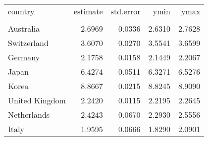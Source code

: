 \begin{tabular}{lrrrr}
   \toprule 
 
country & estimate & std.error & ymin & ymax \\ 

\cmidrule(lr){1-5} 
 
\\[-1.8ex]  
 
Australia & 2.6969 & 0.0336 & 2.6310 & 2.7628 \\ 
  Switzerland & 3.6070 & 0.0270 & 3.5541 & 3.6599 \\ 
  Germany & 2.1758 & 0.0158 & 2.1449 & 2.2067 \\ 
  Japan & 6.4274 & 0.0511 & 6.3271 & 6.5276 \\ 
  Korea & 8.8667 & 0.0215 & 8.8245 & 8.9090 \\ 
  United Kingdom & 2.2420 & 0.0115 & 2.2195 & 2.2645 \\ 
  Netherlands & 2.4243 & 0.0670 & 2.2930 & 2.5556 \\ 
  Italy & 1.9595 & 0.0666 & 1.8290 & 2.0901 \\ 
   \bottomrule  
\end{tabular}

